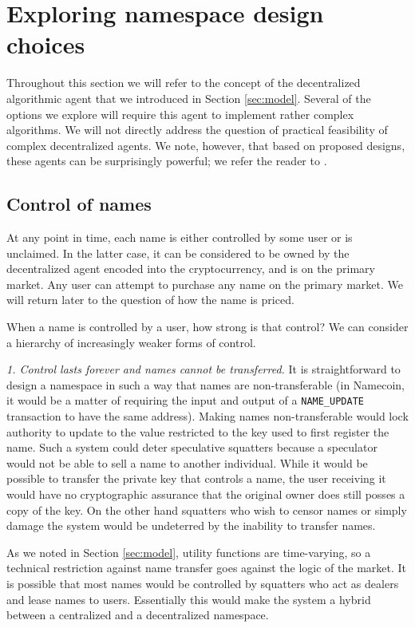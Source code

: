 \section{Exploring namespace design choices}
\label{sec:design}

Throughout this section we will refer to the concept of the decentralized algorithmic agent that we introduced in Section \ref{sec:model}. Several of the options we explore will require this agent to implement rather complex algorithms. We will not directly address the question of practical feasibility of complex decentralized agents. We note, however, that based on proposed designs, these agents can be surprisingly powerful; we refer the reader to \cite{bonneau2014decentralizing,ethereumwhitepaper,agents}.


\subsection{Control of names}
At any point in time, each name is either controlled by some user or is unclaimed. In the latter case, it can be considered to be owned by the decentralized agent encoded into the cryptocurrency, and is on the primary market. Any user can attempt to purchase any name on the primary market. We will return later to the question of how the name is priced. 

When a name is controlled by a user, how strong is that control? We can consider a hierarchy of increasingly weaker forms of control.

{\em 1. Control lasts forever and names cannot be transferred.} It is straightforward to design a namespace in such a way that names are non-transferable (in Namecoin, it would be a matter of requiring the input and output of a {\tt NAME\_UPDATE} transaction to have the same address). Making names non-transferable would lock authority to update to the value restricted to the key used to first register the name. Such a system could deter speculative squatters because a speculator would not be able to sell a name to another individual. While it would be possible to transfer the private key that controls a name, the user receiving it would have no cryptographic assurance that the original owner does still posses a copy of the key. On the other hand squatters who wish to censor names or simply damage the system would be undeterred by the inability to transfer names.

As we noted in Section \ref{sec:model}, utility functions are time-varying, so a technical restriction against name transfer goes against the logic of the market. It is possible that most names would be controlled by squatters who act as dealers and lease names to users. Essentially this would make the system a hybrid between a centralized and a decentralized namespace.


